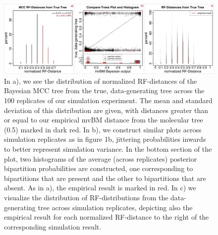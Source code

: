 \documentclass[10pt, twocolumn, twoside]{article}
\begin{document}
\begin{figure}[h]
\centering
\includegraphics[width=160mm]{figures/harvati_figure3_final_redo.pdf}
\caption[Visualizing Results of Empirically Parameterized Simulation Study Relative to Empirical Result]{In a), we see the distribution of normalized RF-distances of the Bayesian MCC tree from the true, data-generating tree across the 100 replicates of our simulation experiment. The mean and standard deviation of this distribution are given, with distances greater than or equal to our empirical mvBM distance from the molecular tree (0.5) marked in dark red. In b), we construct similar plots across simulation replicates as in figure 1b, jittering probabilities inwards to better represent simulation variance. In the bottom section of the plot, two histograms of the average (across replicates) posterior bipartition probabilities are constructed, one corresponding to bipartitions that are present and the other to bipartitions that are absent. As in a), the empirical result is marked in red. In c) we visualize the distribution of RF-distributions from the data-generating tree across simulation replicates, depicting also the empirical result for each normalized RF-distance to the right of the corresponding simulation result. \label{overflow}
\label{fig:harvatiFigure3}}
\end{figure}
\end{document}
